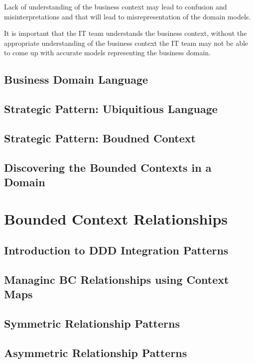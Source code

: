 \documentclass[a4paper, 11pt]{book}
\begin{document}
    Lack of understanding of the business context may lead to confusion and misinterpretations and that will lead to misrepresentation of the domain models.

    It is important that the IT team understands the business context, without the appropriate understanding of the business context the IT team may not be able to come up with accurate models representing the business domain.


    \section{Business Domain Language}


    \section{Strategic Pattern: Ubiquitious Language}


    \section{Strategic Pattern: Boudned Context}


    \section{Discovering the Bounded Contexts in a Domain}


    \chapter{Bounded Context Relationships}


    \section{Introduction to DDD Integration Patterns}


    \section{Managinc BC Relationships using Context Maps}


    \section{Symmetric Relationship Patterns}


    \section{Asymmetric Relationship Patterns}
\end{document}
